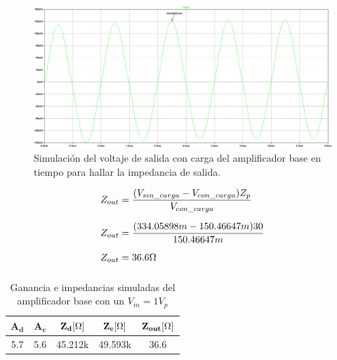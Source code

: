 \begin{enumerate}
\begin{itemize}
                \begin{figure}[H]
                  \centering
                  \includegraphics[width=\textwidth]{Imagenes/vocc_base.png}
                  \caption{Simulación del voltaje de salida con carga del amplificador base en tiempo para hallar la impedancia de salida.}
                  \label{fig:vocc_base}
                \end{figure}

                \begin{align*}
                  Z_{out} & =\dfrac{(V_{sin\_carga}-V_{con\_carga})Z_p}{V_{con\_carga}} \\[0.2cm]
                  Z_{out} & =\dfrac{(334.05898m-150.46647m)30}{150.46647m}              \\[0.2cm]
                  Z_{out} & =36.6\ohm                                                   \\[0.2cm]
                \end{align*}

        \end{itemize}

        \begin{table}[H]
          \centering
          \begin{tabular}{|c|c|c|c|c|}
            \hline
            $\mathbf{A_d}$ & $\mathbf{A_c}$ & $\mathbf{Z_{d}[\ohm]}$ & $\mathbf{Z_{c}[\ohm]}$ & $\mathbf{Z_{out} [\ohm]}$ \\ \hline
            5.7            & 5.6            & 45.212k                & 49.593k                & 36.6                      \\ \hline
          \end{tabular}
          \caption{Ganancia e impedancias simuladas del amplificador base con un $V_{in}=1V_p$}
          \label{tab:dinamico_base_sim1}
        \end{table}


\end{enumerate}

